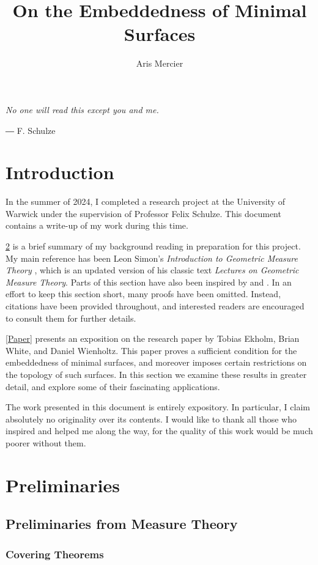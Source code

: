\documentclass[a4paper, 11pt]{article}
\title{On the Embeddedness of Minimal Surfaces}
\author{Aris Mercier}
\date{}
\theoremstyle{plain}
\theoremstyle{definition}
\theoremstyle{remark}
\numberwithin{equation}{subsection}
\begin{document}
\maketitle
\tableofcontents
\newpage

\epigraph{\emph{No one will read this except you and me.}}{― F. Schulze}
\section{Introduction}
In the summer of 2024, I completed a research project at the University of Warwick under the supervision of Professor Felix Schulze. This document contains a write-up of my work during this time.

\cref{Preliminaries} is a brief summary of my background reading in preparation for this project. My main reference has been Leon Simon's \emph{Introduction to Geometric Measure Theory} \cite{Sim18}, which is an updated version of his classic text \emph{Lectures on Geometric Measure Theory}. Parts of this section have also been inspired by \cite{Rin22} and \cite{Mor16}. In an effort to keep this section short, many proofs have been omitted. Instead, citations have been provided throughout, and interested readers are encouraged to consult them for further details.

\cref{Paper} presents an exposition on the research paper \cite{EWW02} by Tobias Ekholm, Brian White, and Daniel Wienholtz. This paper proves a sufficient condition for the embeddedness of minimal surfaces, and moreover imposes certain restrictions on the topology of such surfaces. In this section we examine these results in greater detail, and explore some of their fascinating applications.

The work presented in this document is entirely expository. In particular, I claim absolutely no originality over its contents. I would like to thank all those who inspired and helped me along the way, for the quality of this work would be much poorer without them.

\section{Preliminaries}
\label{Preliminaries}

\subsection{Preliminaries from Measure Theory}

\subsubsection{Covering Theorems}
\end{document}
